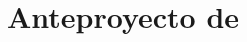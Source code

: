 \documentclass[11pt,a4paper,oneside]{article}
\title{Anteproyecto de \myWorkTypeFull}        %
\date{\myThesisProposalDate}                         %
\author{\myAuthorFullName}
\begin{document}

% 


% 

\maketitle

\begin{description}                               %
\item[\expandafter\makefirstuc\expandafter{\wordAutorOrAutora}:] \myAuthorFullName                       %
\item[\expandafter\makefirstuc\expandafter{\wordTutorOrTutores}:] \myAdvisors                   %
  \item[Titulación:] \myDegreefull                %
  \item[Título:] \myBookTitleSpanish              %
  {                                               %
  \item[Título en inglés:] \myBookTitleEnglish    %
  }                                               %
  {                                               %
  }                                               %
\item[Departamento:] \myDepartment                %
\end{description}                                 %


\end{document}
